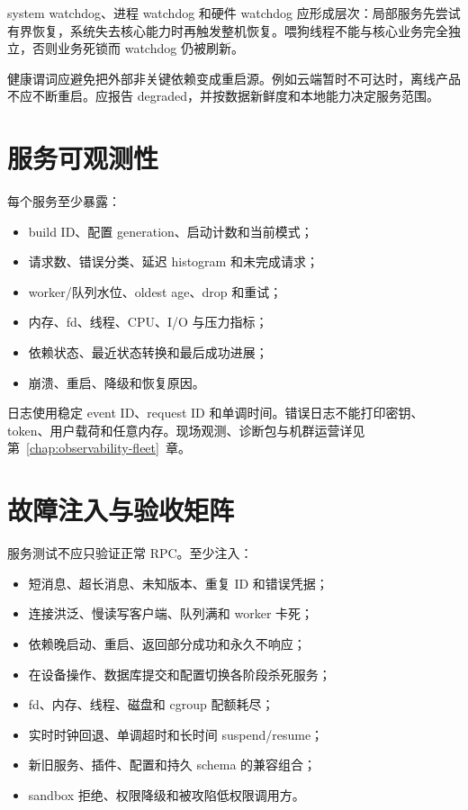 system watchdog、进程 watchdog 和硬件 watchdog 应形成层次：局部服务先尝试有界恢复，系统失去核心能力时再触发整机恢复。喂狗线程不能与核心业务完全独立，否则业务死锁而 watchdog 仍被刷新。

健康谓词应避免把外部非关键依赖变成重启源。例如云端暂时不可达时，离线产品不应不断重启。应报告 degraded，并按数据新鲜度和本地能力决定服务范围。

\section{服务可观测性}

每个服务至少暴露：

\begin{itemize}
  \item build ID、配置 generation、启动计数和当前模式；
  \item 请求数、错误分类、延迟 histogram 和未完成请求；
  \item worker/队列水位、oldest age、drop 和重试；
  \item 内存、fd、线程、CPU、I/O 与压力指标；
  \item 依赖状态、最近状态转换和最后成功进展；
  \item 崩溃、重启、降级和恢复原因。
\end{itemize}

日志使用稳定 event ID、request ID 和单调时间。错误日志不能打印密钥、token、用户载荷和任意内存。现场观测、诊断包与机群运营详见第~\ref{chap:observability-fleet}~章。

\section{故障注入与验收矩阵}

服务测试不应只验证正常 RPC。至少注入：

\begin{itemize}
  \item 短消息、超长消息、未知版本、重复 ID 和错误凭据；
  \item 连接洪泛、慢读写客户端、队列满和 worker 卡死；
  \item 依赖晚启动、重启、返回部分成功和永久不响应；
  \item 在设备操作、数据库提交和配置切换各阶段杀死服务；
  \item fd、内存、线程、磁盘和 cgroup 配额耗尽；
  \item 实时时钟回退、单调超时和长时间 suspend/resume；
  \item 新旧服务、插件、配置和持久 schema 的兼容组合；
  \item sandbox 拒绝、权限降级和被攻陷低权限调用方。
\end{itemize}


